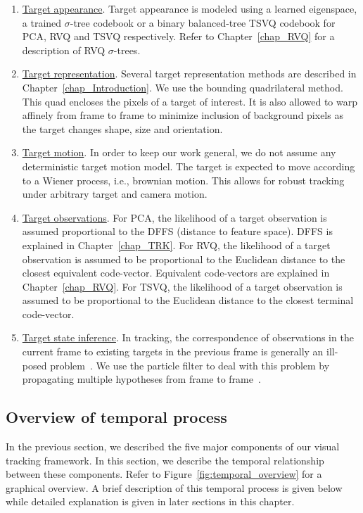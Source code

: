 \begin{enumerate}
\item \underline{ Target appearance}.  Target appearance is modeled using a learned eigenspace, a trained $\sigma$-tree codebook or a binary balanced-tree TSVQ codebook for PCA, RVQ and TSVQ respectively.  Refer to Chapter~\ref{chap_RVQ} for a description of RVQ  $\sigma$-trees.

\item \underline{Target representation}.  Several target representation methods are described in Chapter~\ref{chap_Introduction}.  We use the bounding quadrilateral method.  This quad encloses the pixels of a target of interest.  It is also allowed to warp affinely from frame to frame to minimize inclusion of background pixels as the target changes shape, size and orientation.

\item \underline{Target motion}.  In order to keep our work general, we do not assume any deterministic target motion model.  The target is expected to move according to a Wiener process, i.e., brownian motion.  This allows for robust tracking under arbitrary target and camera motion.

\item \underline{Target observations}.  For PCA, the likelihood of a target observation is assumed proportional to the DFFS (distance to feature space).  DFFS is explained in Chapter~\ref{chap_TRK}.  For RVQ, the likelihood of a target observation is assumed to be proportional to the Euclidean distance to the closest equivalent code-vector.  Equivalent code-vectors are explained in Chapter~\ref{chap_RVQ}.  For TSVQ, the likelihood of a target observation is assumed to be proportional to the Euclidean distance to the closest terminal code-vector.

\item \underline{Target state inference}.  In tracking, the correspondence of observations in the current frame to existing targets in the previous frame is generally an ill-posed problem~\cite{2005_CNF_TRK_Yang}.  We use the particle filter to deal with this problem by propagating multiple hypotheses from frame to frame~\cite{1998_JNL_Condensation_IsardBlake}.

\end{enumerate}

\subsection{Overview of temporal process}
In the previous section, we described the five major components of our visual tracking framework.  In this section, we describe the temporal relationship between these components.  Refer to Figure~\ref{fig:temporal_overview} for a graphical overview.  A brief description of this temporal process is given below while detailed explanation is given in later sections in this chapter.

